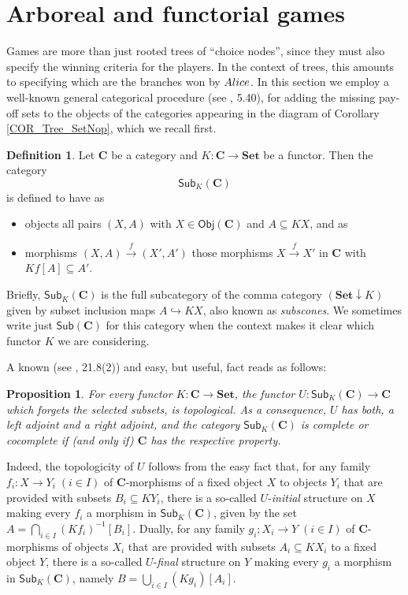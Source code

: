 \documentclass[12pt]{amsart}
\newtheorem{prop}[thm]{Proposition}
\theoremstyle{definition}
\newtheorem{defn}[thm]{Definition}
\newcommand{\ali}{\textup{\textmd{\textsc{Alice}}}}
\newcommand{\Obj}[1]{\mathsf{Obj}\left({#1}\right)}
\newcommand{\Sets}{\mathbf{Set}}
\begin{document}
\section{Arboreal and functorial games}\label{SEC_SubTree}
Games are more than just rooted trees of ``choice nodes'', since they must also specify the winning criteria for the players. In the context of trees, this amounts to specifying which are the branches won by $\ali$. In this section we employ a well-known general categorical procedure (see \cite{Adamek1990}, 5.40), for adding the missing pay-off sets to the objects of the categories appearing in the diagram of Corollary \ref{COR_Tree_SetNop}, which we recall first.



\begin{defn}
	Let $\mathbf{C}$ be a category and $K\colon \mathbf{C}\to \Sets$ be a functor. Then the category $$\mathsf{Sub}_K(\mathbf C)$$ is defined to have as
	\begin{itemize}
		\item objects all pairs $(X,A)$ with $X\in \Obj{\mathbf{C}}$ and $A\subseteq KX$, and as
		\item morphisms $(X,A) \stackrel{f}{\to}(X',A')$ those morphisms $X\stackrel{f}{\to}X'$ in $\mathbf{C}$ with $Kf[A]\subseteq A'$.
	\end{itemize} 
	Briefly, $\mathsf{Sub}_K(\mathbf C)$ is the full subcategory of the comma category $(\Sets\downarrow K)$ given by subset inclusion maps $A\hookrightarrow KX$, also known as {\em subscones}.  We sometimes write just $\mathsf{Sub}(\mathbf C)$ for this category when the context makes it clear which functor $K$ we are considering.
\end{defn}

A known (see \cite{Adamek1990}, 21.8(2)) and easy, but useful, fact reads as follows:

\begin{prop}\label{PROP_TopFunctor}
	For every functor $K\colon \mathbf{C}\to \Sets$, the functor $U\colon \mathsf{Sub}_K(\mathbf C)\to\mathbf C$ which forgets the selected subsets, is topological. As a consequence, $U$ has both, a left adjoint and a right adjoint, and the category $\mathsf{Sub}_K(\mathbf C)$ is complete or cocomplete if (and only if) $\mathbf C$ has the respective property. 
\end{prop}

Indeed, the topologicity of $U$ follows from the easy fact that, for any family $f_i:X\to Y_i\;(i\in I)$ of $\mathbf C$-morphisms of a fixed object $X$ to objects $Y_i$ that are provided with subsets $B_i\subseteq KY_i$, there is a so-called $U$-{\em initial} structure on $X$ making every $f_i$ a morphism in $\mathsf{Sub}_K(\mathbf C)$, given by the set $A=\bigcap_{i\in I}(Kf_i)^{-1}[B_i]$. Dually, for any family $g_i;X_i\to Y\;(i\in I)$ of $\mathbf C$-morphisms of objects $X_i$ that are provided with subsets $A_i\subseteq KX_i$ to a fixed object $Y$, there is a so-called $U$-{\em final} structure on $Y$ making every $g_i$ a morphism in $\mathsf{Sub}_K(\mathbf C)$, namely $B=\bigcup_{i\in I}(Kg_i)[A_i]$.
\end{document}
